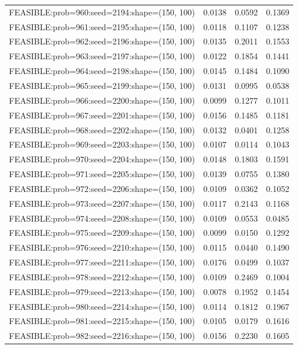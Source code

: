 \begin{longtable}{lccc}
FEASIBLE:prob=960:seed=2194:shape=(150, 100) & 0.0138 & 0.0592 & 0.1369 \\
FEASIBLE:prob=961:seed=2195:shape=(150, 100) & 0.0118 & 0.1107 & 0.1238 \\
FEASIBLE:prob=962:seed=2196:shape=(150, 100) & 0.0135 & 0.2011 & 0.1553 \\
FEASIBLE:prob=963:seed=2197:shape=(150, 100) & 0.0122 & 0.1854 & 0.1441 \\
FEASIBLE:prob=964:seed=2198:shape=(150, 100) & 0.0145 & 0.1484 & 0.1090 \\
FEASIBLE:prob=965:seed=2199:shape=(150, 100) & 0.0131 & 0.0995 & 0.0538 \\
FEASIBLE:prob=966:seed=2200:shape=(150, 100) & 0.0099 & 0.1277 & 0.1011 \\
FEASIBLE:prob=967:seed=2201:shape=(150, 100) & 0.0156 & 0.1485 & 0.1181 \\
FEASIBLE:prob=968:seed=2202:shape=(150, 100) & 0.0132 & 0.0401 & 0.1258 \\
FEASIBLE:prob=969:seed=2203:shape=(150, 100) & 0.0107 & 0.0114 & 0.1043 \\
FEASIBLE:prob=970:seed=2204:shape=(150, 100) & 0.0148 & 0.1803 & 0.1591 \\
FEASIBLE:prob=971:seed=2205:shape=(150, 100) & 0.0139 & 0.0755 & 0.1380 \\
FEASIBLE:prob=972:seed=2206:shape=(150, 100) & 0.0109 & 0.0362 & 0.1052 \\
FEASIBLE:prob=973:seed=2207:shape=(150, 100) & 0.0117 & 0.2143 & 0.1168 \\
FEASIBLE:prob=974:seed=2208:shape=(150, 100) & 0.0109 & 0.0553 & 0.0485 \\
FEASIBLE:prob=975:seed=2209:shape=(150, 100) & 0.0099 & 0.0150 & 0.1292 \\
FEASIBLE:prob=976:seed=2210:shape=(150, 100) & 0.0115 & 0.0440 & 0.1490 \\
FEASIBLE:prob=977:seed=2211:shape=(150, 100) & 0.0176 & 0.0499 & 0.1037 \\
FEASIBLE:prob=978:seed=2212:shape=(150, 100) & 0.0109 & 0.2469 & 0.1004 \\
FEASIBLE:prob=979:seed=2213:shape=(150, 100) & 0.0078 & 0.1952 & 0.1454 \\
FEASIBLE:prob=980:seed=2214:shape=(150, 100) & 0.0114 & 0.1812 & 0.1967 \\
FEASIBLE:prob=981:seed=2215:shape=(150, 100) & 0.0105 & 0.0179 & 0.1616 \\
FEASIBLE:prob=982:seed=2216:shape=(150, 100) & 0.0156 & 0.2230 & 0.1605 \\

\end{longtable}
